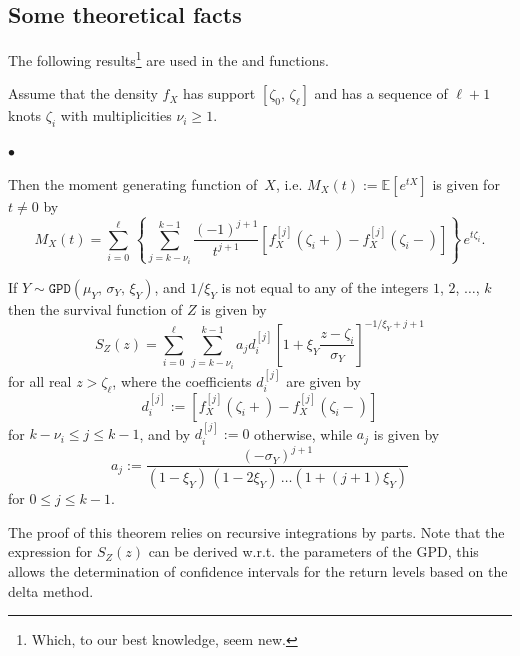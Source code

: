 \documentclass[11pt,a4paper]{report}\usepackage[]{graphicx}\usepackage[]{color}
\newcommand{\Esp}{\mathbb{E}}
\begin{document}

\subsection{Some theoretical facts}
The following results\footnote{Which, to our best knowledge, seem new.}
are used in the \verb@momGen@ and \verb@GPtail@ functions.

\begin{theo}
  \label{lemma:LemmaMomGen}
  Assume that the density $f_X$ has support
  $[\zeta_0,\,\zeta_{\ell}]$ and has a sequence of $\ell+1$ knots
  $\zeta_i$ with multiplicities $\nu_i \geqslant 1$. 
  
  \begin{list}{$\bullet$}{ }
  \item Then the moment
    generating function of~$X$, i.e.  $M_X(t):= \Esp[e^{tX}]$ is given for $t \neq 0$ 
    by
    $$
    M_X(t) = \sum_{i=0}^\ell \, \left\{ \sum_{j = k-\nu_i}^{k-1}
      \frac{(-1)^{j+1}}{t^{j+1}} \left[ f^{[j]}_X(\zeta_i+) -
        f^{[j]}_X(\zeta_i-) \right] \right\} \, e^{t \zeta_i}.
    $$
  \item If $Y \sim \mathtt{GPD}(\mu_Y,\,\sigma_Y,\,\xi_Y)$, and 
    $1/\xi_Y$ is not equal to any of the integers $1$, $2$, $\dots$, $k$ then
    the survival function of $Z$ is given by
    \begin{equation}
      \label{eq:SSplineGPD}
      S_Z(z) = \sum_{i=0}^{\ell} \, \sum_{j=k-\nu_i}^{k-1} a_j d_i^{[j]} 
      \left[1 + \xi_Y \frac{z-\zeta_i}{\sigma_Y} \right]^{-1/\xi_Y + j +1 }   
    \end{equation}
    for all real $z > \zeta_{\ell}$, where the coefficients $d_i^{[j]}$
    are given by 
    $$
    d_i^{[j]} := 
    \left[f^{[j]}_X(\zeta_i+) - f^{[j]}_X(\zeta_i-) \right]
    $$
    for $k - \nu_i \leqslant j \leqslant k-1$, and by $d_i^{[j]} :=0$
    otherwise, while $a_j$ is given by 
  $$
  a_j := \frac{(-\sigma_Y)^{j+1}}{(1-\xi_Y)\,(1 - 2 \xi_Y)\,     
    \dots 
    (1 + (j+1) \xi_Y)}
  $$ 
  for $0 \leqslant j \leqslant k-1$. 
\end{list}
  
\end{theo}

The proof of this theorem relies on recursive integrations by
parts. Note that the expression for $S_Z(z)$ can be
derived w.r.t. the parameters of the GPD, this allows the
determination of confidence intervals for the return levels based on
the delta method.  
\end{document}
